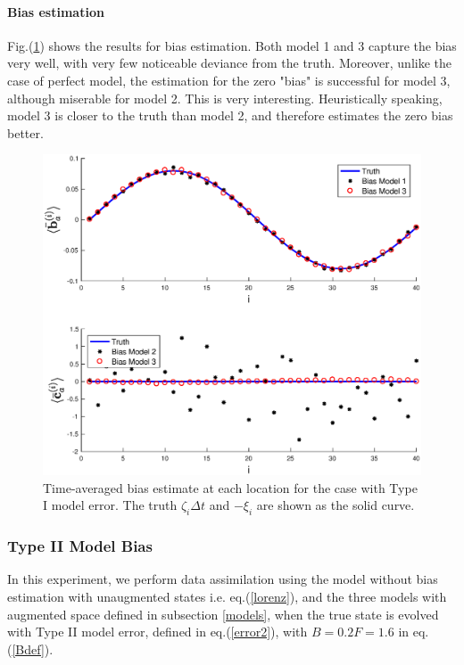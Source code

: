 \documentclass[twocolumn]{article}
\begin{document}
\paragraph{Bias estimation}
Fig.(\ref{BiasEstM1}) shows the results for bias estimation. Both model 1 and 3 capture the bias very well, with very few noticeable deviance from the truth. Moreover, unlike the case of perfect model, the estimation for the zero "bias" is successful for model 3, although miserable for model 2. This is very interesting. Heuristically speaking, model 3 is closer to the truth than model 2, and therefore estimates the zero bias better.
\begin{figure} 
\centering
\includegraphics[scale=0.3]{Figures/BiasEstM1}
\caption{Time-averaged bias estimate at each location for the case with Type I model error. The truth $\zeta_i\Delta t$ and $-\xi_i$ are shown as the solid curve.}
\label{BiasEstM1}
\end{figure}
\subsubsection{Type II Model Bias}
In this experiment, we perform data assimilation using the model without bias estimation with unaugmented states i.e. eq.(\ref{lorenz}), and the three models with augmented space defined in subsection \ref{models}, when the true state is evolved with Type II model error, defined in eq.(\ref{error2}), with $B=0.2F=1.6$ in eq.(\ref{Bdef}).
\end{document}
